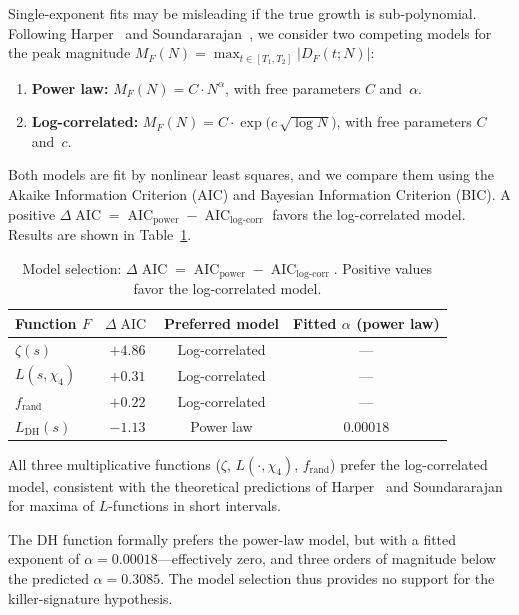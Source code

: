 \documentclass[11pt]{amsart}
\theoremstyle{definition}
\theoremstyle{remark}
\renewcommand{\DH}{\mathrm{DH}}
\newcommand{\abs}[1]{\lvert #1 \rvert}
\DeclareMathOperator{\AIC}{AIC}
\begin{document}
Single-exponent fits may be misleading if the true growth is
sub-polynomial.  Following Harper~\cite{Harper2013} and
Soundararajan~\cite{Soundararajan2009}, we consider two competing
models for the peak magnitude $M_F(N) = \max_{t \in [T_1, T_2]}
\abs{D_F(t;N)}$:

\begin{enumerate}
\item \textbf{Power law:}
  $M_F(N) = C \cdot N^{\alpha}$, with free parameters $C$ and~$\alpha$.

\item \textbf{Log-correlated:}
  $M_F(N) = C \cdot \exp\!\bigl(c\,\sqrt{\log N}\bigr)$,
  with free parameters $C$ and~$c$.
\end{enumerate}

Both models are fit by nonlinear least squares, and we compare them
using the Akaike Information Criterion (AIC) and Bayesian Information
Criterion (BIC).  A positive $\Delta\AIC = \AIC_{\mathrm{power}} -
\AIC_{\mathrm{log\text{-}corr}}$ favors the log-correlated model.
Results are shown in Table~\ref{tab:model-selection}.

\begin{table}[ht]
\centering
\caption{Model selection: $\Delta\AIC =
  \AIC_{\mathrm{power}} - \AIC_{\mathrm{log\text{-}corr}}$.
  Positive values favor the log-correlated model.}
\label{tab:model-selection}
\begin{tabular}{@{}lccc@{}}
\toprule
Function $F$ & $\Delta\AIC$ & Preferred model &
  Fitted $\alpha$ (power law) \\
\midrule
$\zeta(s)$           & $+4.86$ & Log-correlated & --- \\
$L(s, \chi_4)$       & $+0.31$ & Log-correlated & --- \\
$f_{\mathrm{rand}}$  & $+0.22$ & Log-correlated & --- \\
$L_{\DH}(s)$         & $-1.13$ & Power law      & $0.00018$ \\
\bottomrule
\end{tabular}
\end{table}

All three multiplicative functions ($\zeta$, $L(\cdot,\chi_4)$,
$f_{\mathrm{rand}}$) prefer the log-correlated model, consistent with
the theoretical predictions of Harper~\cite{Harper2013} and
Soundararajan~\cite{Soundararajan2009} for maxima of $L$-functions in
short intervals.

The DH function formally prefers the power-law model, but with a
fitted exponent of $\alpha = 0.00018$---effectively zero, and three
orders of magnitude below the predicted $\alpha = 0.3085$.  The model
selection thus provides no support for the killer-signature hypothesis.
\end{document}
